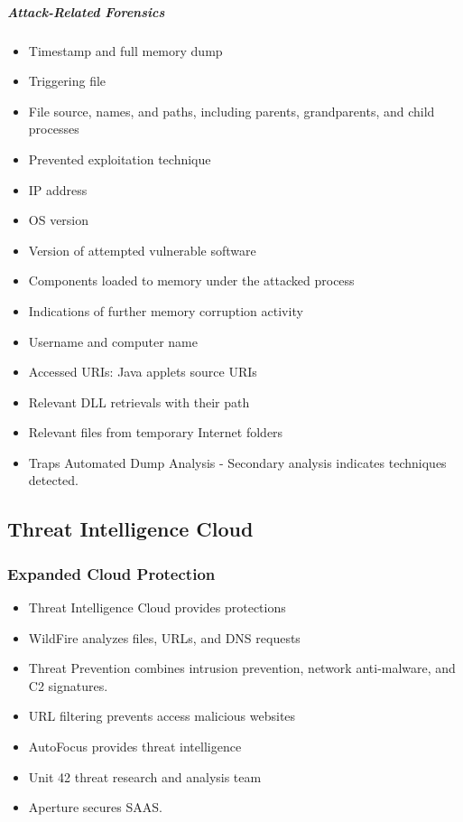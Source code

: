\subparagraph{Attack-Related Forensics}
\begin{itemize}
    \item Timestamp and full memory dump
    \item Triggering file
    \item File source, names, and paths, including parents, grandparents, and child processes
    \item Prevented exploitation technique
    \item IP address
    \item OS version
    \item Version of attempted vulnerable software
    \item Components loaded to memory under the attacked process
    \item Indications of further memory corruption activity
    \item Username and computer name
    \item Accessed URIs: Java applets source URIs
    \item Relevant DLL retrievals with their path
    \item Relevant files from temporary Internet folders
    \item Traps Automated Dump Analysis - Secondary analysis indicates techniques detected.
\end{itemize}


\subsection{Threat Intelligence Cloud}
\subsubsection{Expanded Cloud Protection}
\begin{itemize}
    \item Threat Intelligence Cloud provides protections
    \item WildFire analyzes files, URLs, and DNS requests
    \item Threat Prevention combines intrusion prevention, network anti-malware, and C2 signatures.
    \item URL filtering prevents access malicious websites
    \item AutoFocus provides threat intelligence
    \item Unit 42 threat research and analysis team
    \item Aperture secures SAAS.
\end{itemize}

